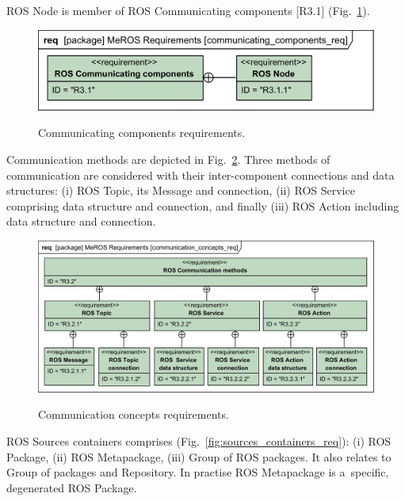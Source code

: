 \documentclass[11pt,oneside,a4paper]{report}
\begin{document}
	 ROS Node is member of ROS Communicating components [R3.1]  (Fig.~\ref{fig:communicating_components_req}).

	\begin{figure}[H]
		\centering
		\begin{center}
			{\includegraphics[scale=1.0]{diagrams/communicating_components_req.png}}
		\end{center}
		\caption{Communicating components requirements.} 
		\label{fig:communicating_components_req}
	\end{figure}
	
	Communication methods are depicted in Fig.~\ref{fig:communication_concepts_req}.
	 Three methods of communication are considered with their inter-component connections and data structures: (i) ROS Topic, its Message and connection, (ii) ROS Service comprising data structure and connection, and finally (iii) ROS Action including data structure and connection.
	
	\begin{figure}[H]
		\centering
		\begin{center}
			{\includegraphics[scale=.98]{diagrams/communication_concepts_req.png}}
		\end{center}
		\caption{Communication concepts requirements.} 
		\label{fig:communication_concepts_req}
	\end{figure}
	
	ROS Sources containers comprises (Fig.~\ref{fig:sources_containers_req}): (i) ROS Package, (ii) ROS Metapackage, (iii) Group of ROS packages. It also relates to Group of packages and Repository. In practise ROS Metapackage is a~specific, degenerated ROS Package.
	
\end{document}
